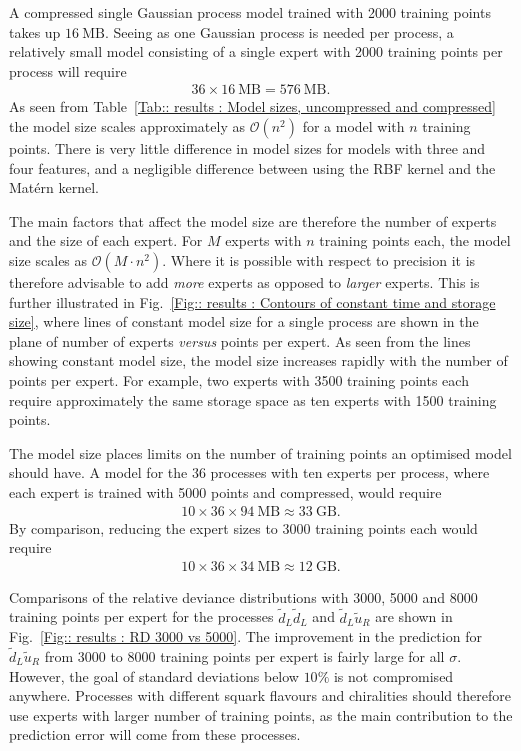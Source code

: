 \documentclass[twoside,english]{uiofysmaster}
\begin{document}
{{A compressed single Gaussian process model trained with 2000 training points takes up $16~\mathrm{MB}$. Seeing as one Gaussian process is needed per process, a relatively small model consisting of a single expert with 2000 training points per process will require
\begin{align*}
36 \times 16~ \text{MB} = 576~\text{MB}.
\end{align*}
As seen from Table~\ref{Tab:: results : Model sizes, uncompressed and compressed} the model size scales approximately as $\mathcal{O}( n^2)$ for a model with $n$ training points. There is very little difference in model sizes for models with three and four features, and a negligible difference between using the RBF kernel and the Mat\'{e}rn kernel. 

The main factors that affect the model size are therefore the number of experts and the size of each expert. For $M$ experts with $n$ training points each, the model size scales as $\mathcal{O}(M\cdot n^2)$. Where it is possible with respect to precision it is therefore advisable to add \textit{more} experts as opposed to \textit{larger} experts. This is further illustrated in Fig.~\ref{Fig:: results : Contours of constant time and storage size}, where lines of constant model size for a single process are shown in the plane of number of experts \textit{versus} points per expert. As seen from the lines showing constant model size, the model size increases rapidly with the number of points per expert. For example, two experts with 3500 training points each require approximately the same storage space as ten experts with 1500 training points.

The model size places limits on the number of training points an optimised model should have. A model for the 36 processes with ten experts per process, where each expert is trained with 5000 points and compressed, would require
\begin{align*}
10 \times 36 \times 94~\mathrm{MB} \approx 33~\mathrm{GB}. \nonumber
\end{align*}
By comparison, reducing the expert sizes to 3000 training points each would require
\begin{align}
10 \times 36 \times 34~\mathrm{MB} \approx 12~\mathrm{GB}. \nonumber
\end{align}


Comparisons of the relative deviance distributions with 3000, 5000 and 8000 training points per expert for the processes $\widetilde{d}_L \widetilde{d}_L$ and $\widetilde{d}_L \widetilde{u}_R$ are shown in Fig.~\ref{Fig:: results : RD 3000 vs 5000}. The improvement in the prediction for $\widetilde{d}_L \widetilde{u}_R$ from 3000 to 8000 training points per expert is fairly large for all $\sigma$. However, the goal of standard deviations below $10\%$ is not compromised anywhere. Processes with different squark flavours and chiralities should therefore use experts with larger number of training points, as the main contribution to the prediction error will come from these processes. 

}}
\end{document}
